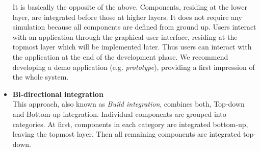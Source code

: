 \documentclass[12pt, notitlepage]{article}
\begin{document}
\begin{itemize}
	It is basically the opposite of the above. Components, residing at the lower layer, are integrated before those at higher layers. 
	It does not require any simulation because all components are defined from ground up. Users interact with an application through the graphical user
	interface, residing at the topmost layer which will be implemented later. Thus users can interact with the application at the end of the development phase. 
	We recommend developing a demo application (e.g. \textit{prototype}), providing a first impression of the whole system.
	\item \textbf{Bi-directional integration}\cite{sw-testing-quality-assurance}\\
	This approach, also known as \textit{Build integration}\cite{schattenbest}, combines both, Top-down and Bottom-up integration. 
	Individual components are grouped into categories. At first, components in each category are integrated bottom-up, leaving the topmost layer.
	Then all remaining components are integrated top-down.
\end{itemize}
\end{document}
